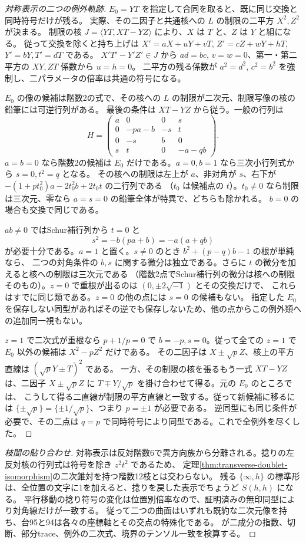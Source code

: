 \begin{proof}[対称表示の二つの例外軌跡]
$E_0=YT$ を指定して合同を取ると、既に同じ交換と同時符号だけが残る。
実際、その二因子と共通核への $L$ の制限の二平方 $X^2,Z^2$ が決まる。
制限の核 $J=\langle YT,XT-YZ\rangle$ により、$X$ は $T$ と、$Z$ は $Y$ と組になる。
従って交換を除くと持ち上げは $X'=aX+uY+vT$, $Z'=cZ+wY+hT$, $Y'=bY,T'=dT$ である。
$X'T'-Y'Z'\in J$ から $ad=bc$, $v=w=0$、第一・第二平方の $XY,ZT$ 係数から $u=h=0$。
二平方の残る係数が $a^2=d^2$, $c^2=b^2$ を強制し、二パラメータの倍率は共通の符号になる。

$E_0$ の像の候補は階数2の式で、その核への $L$ の制限が二次元、制限写像の核の鉛筆には可逆行列がある。
最後の条件は $XT-YZ$ から従う。一般の行列は
\[
 H=\begin{pmatrix}a&0&0&s\\0&-pa-b&-s&t\\0&-s&b&0\\s&t&0&-a-qb\end{pmatrix}.
\]
$a=b=0$ なら階数2の候補は $E_0$ だけである。$a=0,b=1$ なら三次小行列式から $s=0,t^2=q$ となる。
その核への制限は左上が $a$、非対角が $s$、右下が $-(1+pt_0^2)a-2t_0^2 b+2t_0 t$ の二行列である
（$t_0$ は候補点の $t$）。$t_0\ne0$ なら制限は三次元、零なら $a=s=0$ の鉛筆全体が特異で、どちらも除かれる。
$b=0$ の場合も交換で同じである。

$ab\ne0$ ではSchur補行列から $t=0$ と
\[
 s^2=-b(pa+b)=-a(a+qb)
\]
が必要十分である。$a=1$ と置く。$s\ne0$ のとき $b^2+(p-q)b-1$ の根が単純なら、
二つの対角条件の $b,s$ に関する微分は独立である。さらに $t$ の微分を加えると核への制限は三次元である
（階数2点でSchur補行列の微分は核への制限そのもの）。$z=0$ で重根が出るのは $(0,\pm2\sqrt{-1})$ とその交換だけで、
これらはすでに同じ類である。$z=0$ の他の点には $s=0$ の候補もない。
指定した $E_0$ を保存しない同型があればその逆でも保存しないため、他の点からこの例外類への追加同一視もない。

$z=1$ で二次式が重根なら $p+1/p=0$ で $b=-p,s=0$。従って全ての $z=1$ で
$E_0$ 以外の候補は $X^2-pZ^2$ だけである。
その二因子は $X\pm\sqrt p Z$、核上の平方直線は $(\sqrt p Y\pm T)^2$ である。
一方、その制限の核を張るもう一式 $XT-YZ$ は、二因子 $X\pm\sqrt p Z$ に
$T\mp Y/\sqrt p$ を掛け合わせて得る。元の $E_0$ のところでは、
こうして得る二直線が制限の平方直線と一致する。従って新候補に移るには
$\{\pm\sqrt p\}=\{\pm1/\sqrt p\}$、つまり $p=\pm1$ が必要である。
逆同型にも同じ条件が必要で、その二点は $q=p$ で同時符号により同型である。これで全例外を尽くした。
\end{proof}

\begin{proof}[枝間の貼り合わせ]
対称表示は反対階数6で異方向族から分離される。捻りの左反対核の行列式は符号を除き $z^2t^2$ であるため、
定理\ref{thm:transverse-doublet-isomorphism}の二次錐対を持つ階数12枝とは交わらない。
残る $\{\infty,h\}$ の標準形は、全位置の文字に1を加えると、捻りを戻した表示でちょうど $S(h,h)$ になる。
平行移動の捻り符号の変化は位置別倍率なので、証明済みの無印同型により対角線だけが一致する。
従って二つの曲面はいずれも既約な二次元像を持ち、台95と94は各々の座標軸とその交点の特殊化である。
 が二成分の指数、切断、部分trace、例外の二次式、境界のテンソル一致を検算する。
\end{proof}
